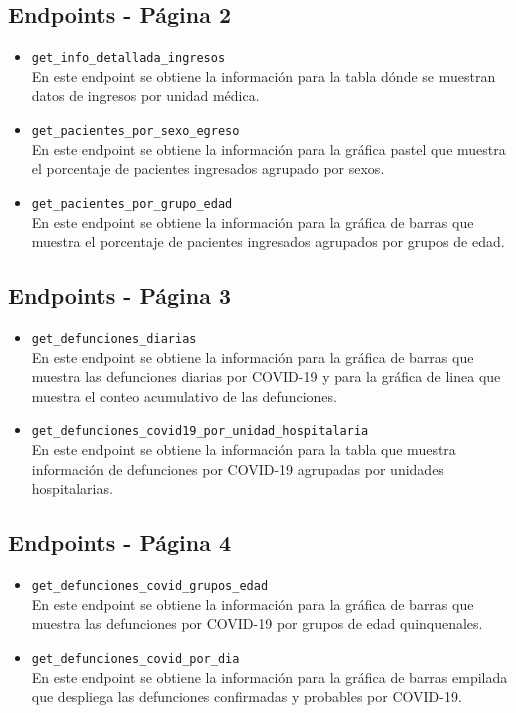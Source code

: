 \subsection{Endpoints - Página 2}
\begin{itemize}
    \item \texttt{get\_info\_detallada\_ingresos}\\
    En este endpoint se obtiene la información para la tabla dónde se muestran datos de ingresos por unidad médica.

    \item \texttt{get\_pacientes\_por\_sexo\_egreso}\\
    En este endpoint se obtiene la información para la gráfica pastel que muestra el porcentaje de pacientes ingresados agrupado por sexos.

    \item \texttt{get\_pacientes\_por\_grupo\_edad}\\
    En este endpoint se obtiene la información para la gráfica de barras que muestra el porcentaje de pacientes ingresados agrupados por grupos de edad.
    
\end{itemize}

\subsection{Endpoints - Página 3}
\begin{itemize}
    \item \texttt{get\_defunciones\_diarias}\\
    En este endpoint se obtiene la información para la gráfica de barras que muestra las defunciones diarias por COVID-19 y para la gráfica de linea que muestra el conteo acumulativo de las defunciones.

    \item \texttt{get\_defunciones\_covid19\_por\_unidad\_hospitalaria}\\
    En este endpoint se obtiene la información para la tabla que muestra información de defunciones por COVID-19 agrupadas por unidades hospitalarias.
    
\end{itemize}

\subsection{Endpoints - Página 4}
\begin{itemize}
    \item \texttt{get\_defunciones\_covid\_grupos\_edad}\\
    En este endpoint se obtiene la información para la gráfica de barras que muestra las defunciones por COVID-19 por grupos de edad quinquenales.

    \item \texttt{get\_defunciones\_covid\_por\_dia}\\
    En este endpoint se obtiene la información para la gráfica de barras empilada que despliega las defunciones confirmadas y probables por COVID-19.
    
\end{itemize}

